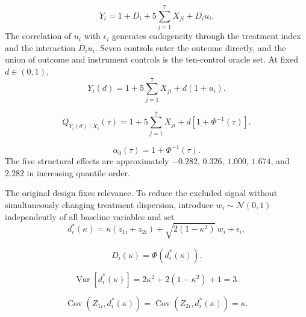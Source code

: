 \begin{equation}
  Y_i=1+D_i+5\sum_{j=1}^{7}X_{ji}+D_i u_i.
  \label{eq:dgp-outcome}
\end{equation}
The correlation of $u_i$ with $\epsilon_i$ generates endogeneity through the treatment index and the interaction $D_i u_i$. Seven controls enter the outcome directly, and the union of outcome and instrument controls is the ten-control oracle set. At fixed $d\in(0,1)$,
\begin{equation}
  Y_i(d)=1+5\sum_{j=1}^{7}X_{ji}+d(1+u_i).
  \label{eq:dgp-potential-outcome}
\end{equation}

\begin{equation}
  Q_{Y_i(d)\mid X_i}(\tau)
  =1+5\sum_{j=1}^{7}X_{ji}
  +d\left[1+\Phi^{-1}(\tau)\right].
  \label{eq:dgp-structural-quantile}
\end{equation}

\begin{equation}
  \alpha_0(\tau)=1+\Phi^{-1}(\tau).
  \label{eq:dgp-alpha-true}
\end{equation}
The five structural effects are approximately $-0.282$, $0.326$, $1.000$, $1.674$, and $2.282$ in increasing quantile order.

\label{sec:instrument-relevance-extension}
The original design fixes relevance. To reduce the excluded signal without simultaneously changing treatment dispersion, introduce $w_i\sim\mathcal N(0,1)$ independently of all baseline variables and set
\begin{equation}
  d_i^*(\kappa)
  =\kappa(z_{1i}+z_{2i})
  +\sqrt{2(1-\kappa^2)}\,w_i
  +\epsilon_i,
  \label{eq:dgp-kappa-index}
\end{equation}

\begin{equation}
  D_i(\kappa)=\Phi\!\left(d_i^*(\kappa)\right).
  \label{eq:dgp-treatment-kappa}
\end{equation}

\begin{equation}
  \operatorname{Var}\!\left[d_i^*(\kappa)\right]
  =2\kappa^2+2(1-\kappa^2)+1=3.
  \label{eq:dgp-kappa-variance}
\end{equation}

\begin{equation}
  \operatorname{Cov}\!\left(Z_{1i},d_i^*(\kappa)\right)
  =\operatorname{Cov}\!\left(Z_{2i},d_i^*(\kappa)\right)
  =\kappa.
  \label{eq:dgp-kappa-relevance}
\end{equation}

